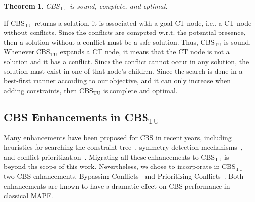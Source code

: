 \documentclass[jair,twoside,11pt,theapa]{article}
\newcommand{\cbstu}{CBS$\mathrm{_{TU}}$\xspace}
\newtheorem{theorem}{Theorem}
\newenvironment{proofo}{\renewcommand{\proofname}{Proof outline}\proof}{\endproof}
\begin{document}

\begin{theorem}
\cbstu is sound, complete, and optimal. 
\end{theorem}
\begin{proofo}
If \cbstu returns a solution, it is associated with a goal CT node, i.e., a CT node without conflicts.
Since the conflicts are computed w.r.t. the potential presence, then a solution without a conflict must be a safe solution.
Thus, \cbstu is sound.
Whenever \cbstu expands a CT node, it means that the CT node is not a solution and it has a conflict.
Since the conflict cannot occur in any solution, the solution must exist in one of that node's children.
Since the search is done in a best-first manner according to our objective, and it can only increase when adding constraints, then \cbstu is complete and optimal.
\end{proofo}


\subsection{CBS Enhancements in \cbstu}
\label{sec:cbs-enhancements}
Many enhancements have been proposed for CBS in recent years, including heuristics for searching the constraint tree~, symmetry detection mechanisms~, and conflict prioritization~.  %
Migrating all these enhancements to \cbstu is beyond the scope of this work. 
Nevertheless, we chose to incorporate in \cbstu two CBS enhancements, Bypassing Conflicts~ and Prioritizing Conflicts~. 
Both enhancements are known to have a dramatic effect on CBS performance in classical MAPF.
\end{document}
